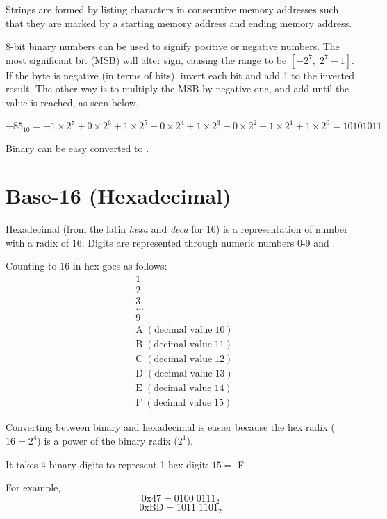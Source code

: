 Strings are formed by listing characters in consecutive memory addresses such that they are marked by a starting memory address and ending memory address. 

8-bit binary numbers can be used to signify positive or negative numbers.  
The most significant bit (MSB) will alter sign, causing the range to be $[-2^{7}, \; 2^{7}-1]$. If the byte is negative (in terms of bits), invert each bit and add 1 to the inverted result. The other way is to multiply the MSB by negative one, and add until the value is reached, as seen below. 

\[
-85_{10} = -1 \times 2^7 + 0 \times 2^6 + 1 \times 2^5 + 0 \times 2^4 + 1 \times 2^3 + 0 \times 2^2 + 1 \times 2^1 + 1 \times 2^0 = 1010 1011
\]

Binary can be easy converted to . 

\section{Base-16 (Hexadecimal)}
Hexadecimal (from the latin \emph{hexa} and \emph{deca} for 16) is a representation of number with a radix of 16. Digits are represented through numeric numbers 0-9 and . 

Counting to 16 in hex goes as follows:
\begin{align*}
  &1 \\
  &2 \\
  &3 \\
  &\dots \\
  &9 \\
  &\text{A} \; (\text{decimal value} \;  10) \\
  &\text{B} \; (\text{decimal value} \; 11) \\
  &\text{C} \; (\text{decimal value} \; 12) \\
  &\text{D} \; (\text{decimal value} \; 13) \\
  &\text{E} \; (\text{decimal value} \; 14) \\
  &\text{F} \; (\text{decimal value} \; 15)
\end{align*}

Converting between binary and hexadecimal is easier because the hex radix ($16 = 2^4$) is a power of the binary radix ($2^1$). 

It takes 4 binary digits to represent 1 hex digit: $15 =$ F

For example,
\[0\text{x}47 = 0100 \; 0111_{2}\]
\[0\text{x}\text{BD} = 1011 \; 1101_{2}\]



